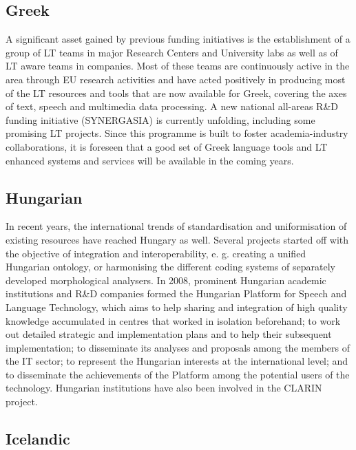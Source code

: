 \documentclass[10pt, plain]{../../metanetpaper}
\begin{document}
\begin{multicols}{2}
\subsection*{Greek}
\label{sec:greek}

A significant asset gained by previous funding initiatives is the establishment of a group of LT teams in major Research Centers and University labs as well as of LT aware teams in companies. Most of these teams are continuously active in the area through EU research activities and have acted positively in producing most of the LT resources and tools that are now available for Greek, covering the axes of text, speech and multimedia data processing. A new national all-areas R\&D funding initiative (SYNERGASIA) is currently unfolding, including some promising LT projects. Since this programme is built to foster academia-industry collaborations, it is foreseen that a good set of Greek language tools and LT enhanced systems and services will be available in the coming years.

\subsection*{Hungarian}
\label{sec:hungarian}

In recent years, the international trends of standardisation and uniformisation of existing resources have reached Hungary as well. Several projects started off with the objective of integration and interoperability, e. g. creating a unified Hungarian ontology, or harmonising the different coding systems of separately developed morphological analysers. In 2008, prominent Hungarian academic institutions and R\&D companies formed the Hungarian Platform for Speech and Language Technology, which aims to help sharing and integration of high quality knowledge accumulated in centres that worked in isolation beforehand; to work out detailed strategic and implementation plans and to help their subsequent implementation; to disseminate its analyses and proposals among the members of the IT sector; to represent the Hungarian interests at the international level; and to disseminate the achievements of the Platform among the potential users of the technology. Hungarian institutions have also been involved in the CLARIN project.

\subsection*{Icelandic}
\label{sec:icelandic}


\end{multicols}
\end{document}
